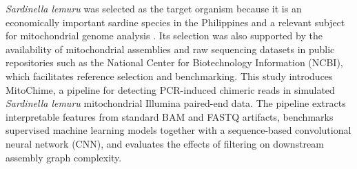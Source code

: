 \textit{Sardinella lemuru} was selected as the target organism because it is an economically important sardine species in the Philippines and a relevant subject for mitochondrial genome analysis \cite{Labrador2021,Willette2011}. Its selection was also supported by the availability of mitochondrial assemblies and raw sequencing datasets in public repositories such as the National Center for Biotechnology Information (NCBI), which facilitates reference selection and benchmarking. This study introduces MitoChime, a pipeline for detecting PCR-induced chimeric reads in simulated \textit{Sardinella lemuru} mitochondrial Illumina paired-end data. The pipeline extracts interpretable features from standard BAM and FASTQ artifacts, benchmarks supervised machine learning models together with a sequence-based convolutional neural network (CNN), and evaluates the effects of filtering on downstream assembly graph complexity.